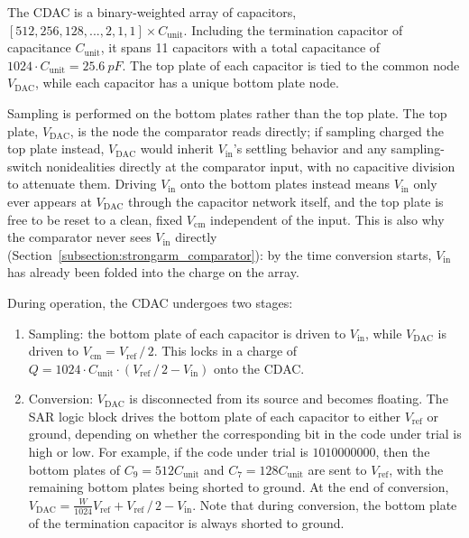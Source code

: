 \documentclass[12pt, a4paper]{article}
\begin{document}
The CDAC is a binary-weighted array of capacitors, $[512, 256, 128, ..., 2, 1, 1] \times C_\mathrm{unit}$. Including the termination capacitor of capacitance 
$C_\mathrm{unit}$, it spans 11 capacitors with a total capacitance of $1024 \cdot C_\mathrm{unit} = \qty{25.6}{pF}$. The top plate of each capacitor is tied to the common node $V_\mathrm{DAC}$,
while each capacitor has a unique bottom plate node.

Sampling is performed on the bottom plates rather than the top plate. The top plate, $V_\mathrm{DAC}$, is the node the comparator reads directly; if sampling charged the top plate instead, $V_\mathrm{DAC}$ would inherit $V_\mathrm{in}$'s settling behavior and any sampling-switch nonidealities directly at the comparator input, with no capacitive division to attenuate them. Driving $V_\mathrm{in}$ onto the bottom plates instead means $V_\mathrm{in}$ only ever appears at $V_\mathrm{DAC}$ through the capacitor network itself, and the top plate is free to be reset to a clean, fixed $V_\mathrm{cm}$ independent of the input. This is also why the comparator never sees $V_\mathrm{in}$ directly (Section~\ref{subsection:strongarm_comparator}): by the time conversion starts, $V_\mathrm{in}$ has already been folded into the charge on the array.

During operation, the CDAC undergoes two stages:

\begin{enumerate}
    \item Sampling: the bottom plate of each capacitor is driven to $V_\mathrm{in}$, while $V_\mathrm{DAC}$ is driven to $V_\mathrm{cm} = V_\mathrm{ref} \, / \, 2$. This locks in a charge of $Q = 1024 \cdot C_\mathrm{unit} \cdot (V_\mathrm{ref} \, / \, 2 - V_\mathrm{in})$ onto the CDAC.
    \item Conversion: $V_\mathrm{DAC}$ is disconnected from its source and becomes floating. The SAR logic block drives the bottom plate of each capacitor to either $V_\mathrm{ref}$ or ground, depending on whether the corresponding bit in the code under trial is high or low. For example, if the code under trial is $1010000000$, then the bottom plates of $C_9 = 512 C_\mathrm{unit}$ and $C_7 = 128 C_\mathrm{unit}$ are sent to $V_\mathrm{ref}$, with the remaining bottom plates being shorted to ground. At the end of conversion, $V_\mathrm{DAC} = \frac{W}{1024} V_\mathrm{ref} + V_\mathrm{ref} \, / \, 2 - V_\mathrm{in}$. Note that during conversion, the bottom plate of the termination capacitor is always shorted to ground.
\end{enumerate}
\end{document}

